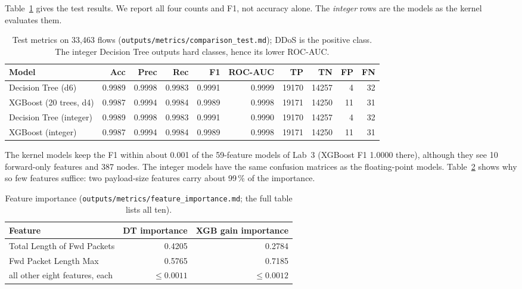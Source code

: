 Table~\ref{tab:metrics} gives the test results. We report all four counts and F1, not accuracy alone. The \emph{integer} rows are the models as the kernel evaluates them.

\begin{table}[htb]
\centering\small
\begin{tabular}{@{}lrrrrrrrrr@{}}
\toprule
Model & Acc & Prec & Rec & F1 & ROC-AUC & TP & TN & FP & FN \\
\midrule
Decision Tree (d6) & 0.9989 & 0.9998 & 0.9983 & 0.9991 & 0.9999 & 19170 & 14257 & 4 & 32 \\
XGBoost (20 trees, d4) & 0.9987 & 0.9994 & 0.9984 & 0.9989 & 0.9998 & 19171 & 14250 & 11 & 31 \\
Decision Tree (integer) & 0.9989 & 0.9998 & 0.9983 & 0.9991 & 0.9990 & 19170 & 14257 & 4 & 32 \\
XGBoost (integer) & 0.9987 & 0.9994 & 0.9984 & 0.9989 & 0.9998 & 19171 & 14250 & 11 & 31 \\
\bottomrule
\end{tabular}
\caption{Test metrics on 33,463 flows (\texttt{outputs/metrics/comparison\_test.md}); DDoS is the positive class. The integer Decision Tree outputs hard classes, hence its lower ROC-AUC.}\label{tab:metrics}
\end{table}

The kernel models keep the F1 within about 0.001 of the 59-feature models of Lab~3 (XGBoost F1 1.0000 there), although they see 10 forward-only features and 387 nodes. The integer models have the same confusion matrices as the floating-point models. Table~\ref{tab:imp} shows why so few features suffice: two payload-size features carry about 99\,\% of the importance.

\begin{table}[htb]
\centering\small
\begin{tabular}{@{}lrr@{}}
\toprule
Feature & DT importance & XGB gain importance \\
\midrule
Total Length of Fwd Packets & 0.4205 & 0.2784 \\
Fwd Packet Length Max & 0.5765 & 0.7185 \\
all other eight features, each & $\le 0.0011$ & $\le 0.0012$ \\
\bottomrule
\end{tabular}
\caption{Feature importance (\texttt{outputs/metrics/feature\_importance.md}; the full table lists all ten).}\label{tab:imp}
\end{table}

